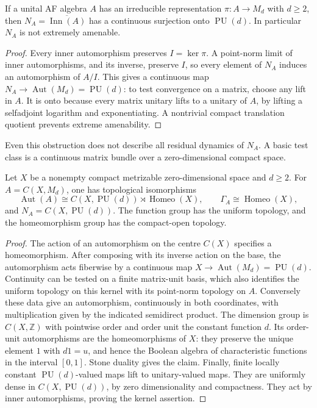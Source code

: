 \begin{proposition}\label{prop:un-fd-obstruction}
If a unital AF algebra \(A\) has an irreducible representation
\(\pi:A\to M_d\) with \(d\geq2\), then \(N_A=\overline{\operatorname{Inn}(A)}\)
has a continuous surjection onto \(\operatorname{PU}(d)\).
In particular \(N_A\) is not extremely amenable.
\end{proposition}
\begin{proof}
Every inner automorphism preserves \(I=\ker\pi\).
A point-norm limit of inner automorphisms, and its inverse, preserve
\(I\), so every element of \(N_A\) induces an automorphism of \(A/I\).
This gives a continuous map \(N_A\to\operatorname{Aut}(M_d)=\operatorname{PU}(d)\):
to test convergence on a matrix, choose any lift in \(A\).
It is onto because every matrix unitary lifts to a unitary of \(A\),
by lifting a selfadjoint logarithm and exponentiating.
A nontrivial compact translation quotient prevents extreme amenability.
\end{proof}

Even this obstruction does not describe all residual dynamics of
\(N_A\). A basic test class is a continuous matrix bundle over a
zero-dimensional compact space.

\begin{proposition}\label{prop:un-gauge}
Let \(X\) be a nonempty compact metrizable zero-dimensional space
and \(d\geq2\). For \(A=C(X,M_d)\), one has topological isomorphisms
\[
 \operatorname{Aut}(A)\cong C(X,\operatorname{PU}(d))\rtimes\operatorname{Homeo}(X),
 \qquad
 \Gamma_A\cong\operatorname{Homeo}(X),
\]
and \(N_A=C(X,\operatorname{PU}(d))\).
The function group has the uniform topology, and the homeomorphism
group has the compact-open topology.
\end{proposition}
\begin{proof}
The action of an automorphism on the centre \(C(X)\) specifies a
homeomorphism. After composing with its inverse action on the base,
the automorphism acts fiberwise by a continuous map
\(X\to\operatorname{Aut}(M_d)=\operatorname{PU}(d)\).
Continuity can be tested on a finite matrix-unit basis, which also
identifies the uniform topology on this kernel with its point-norm
topology on \(A\).
Conversely these data give an automorphism, continuously in both
coordinates, with multiplication given by the indicated semidirect
product.
The dimension group is \(C(X,\mathbb Z)\) with pointwise order and order
unit the constant function \(d\). Its order-unit automorphisms are
the homeomorphisms of \(X\): they preserve the unique element \(1\)
with \(d1=u\), and hence the Boolean algebra of characteristic
functions in the interval \([0,1]\). Stone duality gives the claim.
Finally, finite locally constant \(\operatorname{PU}(d)\)-valued
maps lift to unitary-valued maps. They are uniformly dense in
\(C(X,\operatorname{PU}(d))\), by zero dimensionality and compactness.
They act by inner automorphisms, proving the kernel assertion.
\end{proof}

